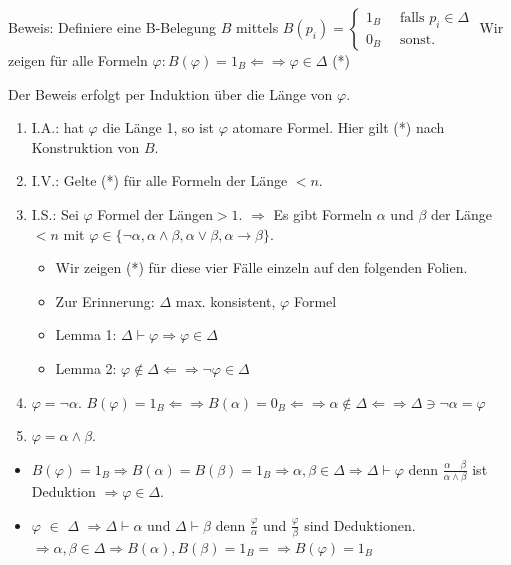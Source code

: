 \documentclass[a4paper]{article}
\begin{document}
\begin{multicols}{3}
  Beweis: Definiere eine B-Belegung $B$ mittels
  $B(p_i) = \begin{cases} 1_B \quad\text{ falls } p_i\in\Delta \\ 0_B \quad\text{ sonst. } \end{cases}$
  Wir zeigen für alle Formeln
  $\varphi: B(\varphi) = 1_B \Leftarrow\Rightarrow\varphi\in\Delta$ (*)

  Der Beweis erfolgt per Induktion über die Länge von $\varphi$.

  \begin{enumerate}
    \itemsep1pt\parskip0pt
    \item
          I.A.: hat $\varphi$ die Länge 1, so ist $\varphi$ atomare Formel. Hier
          gilt (*) nach Konstruktion von $B$.
    \item
          I.V.: Gelte (*) für alle Formeln der Länge $<n$.
    \item
          I.S.: Sei $\varphi$ Formel der Längen$>1$. $\Rightarrow$ Es gibt
          Formeln $\alpha$ und $\beta$ der Länge$<n$ mit
          $\varphi\in\{\lnot\alpha,\alpha\wedge\beta,\alpha\vee\beta,\alpha\rightarrow\beta\}$.

          \begin{itemize}
            \item
                  Wir zeigen (*) für diese vier Fälle einzeln auf den folgenden
                  Folien.
            \item
                  Zur Erinnerung: $\Delta$ max. konsistent, $\varphi$ Formel
            \item
                  Lemma 1: $\Delta\vdash\varphi\Rightarrow\varphi\in\Delta$
            \item
                  Lemma 2:
                  $\varphi\not\in\Delta\Leftarrow\Rightarrow\lnot\varphi\in\Delta$
          \end{itemize}
    \item
          $\varphi =\lnot\alpha$.
          $B(\varphi) = 1_B \Leftarrow\Rightarrow B(\alpha) = 0_B \Leftarrow\Rightarrow \alpha\not\in\Delta\Leftarrow\Rightarrow \Delta \owns\lnot\alpha =\varphi$
    \item
          $\varphi =\alpha\wedge\beta$.
  \end{enumerate}

  \begin{itemize}
    \itemsep1pt\parskip0pt
    \item
          $B(\varphi) = 1_B \Rightarrow B(\alpha) =B(\beta) = 1_B \Rightarrow\alpha,\beta\in\Delta\Rightarrow\Delta\vdash\varphi$
          denn $\frac{\alpha\quad\beta}{\alpha\wedge\beta}$ ist Deduktion
          $\Rightarrow\varphi\in\Delta$.
    \item
          $\varphi$ $\in$ $\Delta$ $\Rightarrow\Delta\vdash\alpha$ und
          $\Delta\vdash\beta$ denn $\frac{\varphi}{\alpha}$ und
          $\frac{\varphi}{\beta}$ sind Deduktionen.
          $\Rightarrow\alpha,\beta\in\Delta\Rightarrow B(\alpha),B(\beta) = 1_B=\Rightarrow B(\varphi) = 1_B$
  \end{itemize}


\end{multicols}
\end{document}
